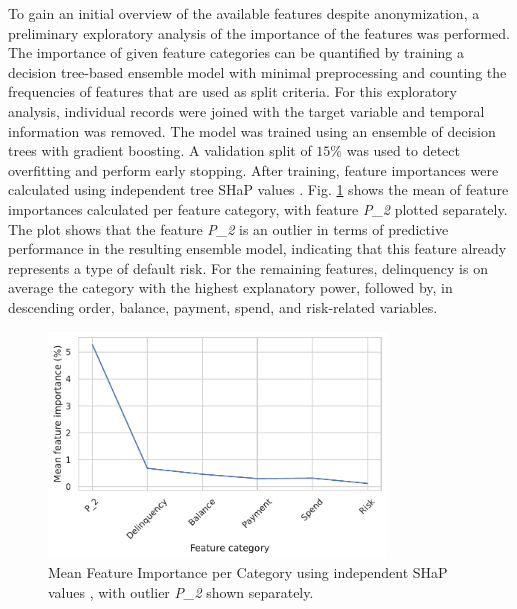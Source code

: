 \documentclass[runningheads]{llncs}
\begin{document}
To gain an initial overview of the available features despite anonymization, a preliminary exploratory analysis of the importance of the features was performed.
The importance of given feature categories can be quantified by training a decision tree-based ensemble model with minimal preprocessing and counting the frequencies of features that are used as split criteria. For this exploratory analysis, individual records were joined with the target variable and temporal information was removed. The model was trained using an ensemble of decision trees with gradient boosting. A validation split of $15\%$ was used to detect overfitting and perform early stopping. After training, feature importances were calculated using independent tree SHaP values \cite{lundberg2020local}. Fig. \ref{fig:feature_importances} shows the mean of feature importances calculated per feature category, with feature \emph{P\_2} plotted separately. The plot shows that the feature \emph{P\_2} is an outlier in terms of predictive performance in the resulting ensemble model, indicating that this feature already represents a type of default risk. For the remaining features, delinquency is on average the category with the highest explanatory power, followed by, in descending order, balance, payment, spend, and risk-related variables.

\begin{figure}
    \centering
    \includegraphics[width=0.8\textwidth]{220924_feature_importance_catboost_rowwise.pdf}
    \caption{Mean Feature Importance per Category using independent SHaP values \cite{lundberg2020local}, with outlier \emph{P\_2} shown separately.}
    \label{fig:feature_importances}
\end{figure}
\end{document}
